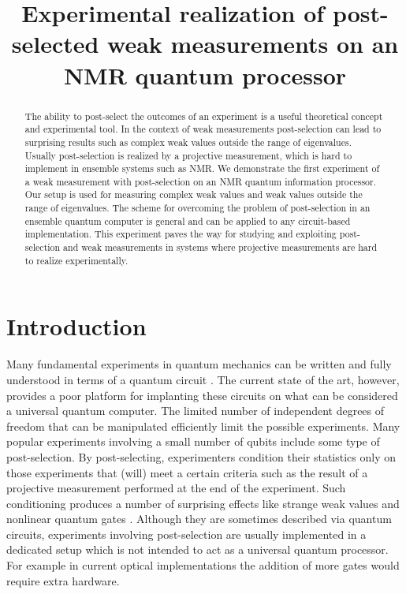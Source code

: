 \documentclass[aps,pra,12pt,onecolumn,showpacs,superscriptaddress,floatfix,footinbib,subfigure]{revtex4}
\begin{document}
\title{Experimental realization of post-selected weak measurements on an NMR quantum processor}



\begin{abstract}
The ability to post-select the outcomes of an experiment is a useful theoretical concept and experimental tool. In the context of   weak measurements post-selection can lead to surprising results such as complex weak values outside the range of eigenvalues.  Usually post-selection is realized by a projective measurement, which is hard to  implement in ensemble systems such as NMR.   We demonstrate the first experiment of a weak measurement with  post-selection on an  NMR quantum information processor. Our setup is used for measuring  complex weak values and weak values outside the range of eigenvalues.  The scheme for overcoming the problem of post-selection in an ensemble quantum computer is general and can be applied to any circuit-based implementation. This experiment  paves the way for studying and exploiting post-selection and weak measurements  in systems where projective measurements are hard to realize experimentally.

\end{abstract}
\maketitle
\section{Introduction}
Many fundamental experiments in quantum mechanics can be written and fully understood in terms of a quantum circuit \cite{Deutsch1985}. The current state of the art, however,  provides a poor platform for implanting these circuits on what can be considered a universal quantum computer. The limited number of  independent degrees of freedom  that can be manipulated efficiently limit the possible experiments. Many popular experiments involving  a small number of qubits  include some type of  post-selection. By post-selecting,  experimenters  condition their statistics only on those experiments that (will) meet a certain criteria such as the result of a projective measurement performed at the end of the experiment. Such conditioning produces a number of surprising effects  like  strange weak values \cite{Aharonov1988} and nonlinear quantum gates \cite{Lloyd2011}. Although they are sometimes described via quantum circuits, experiments  involving post-selection are usually implemented in a dedicated setup  which is not intended to act as a universal quantum processor. For example in current optical implementations  \cite{Lundeen2006,Rozema2012} the addition of more gates would require extra hardware.
\end{document}
